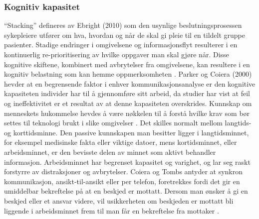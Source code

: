 \subsubsection{Kognitiv kapasitet}
“Stacking” defineres av Ebright (2010) som den usynlige beslutningsprosessen sykepleiere utfører om hva, hvordan og når de skal gi pleie til en tildelt gruppe pasienter. Stadige endringer i omgivelsene og informasjonsflyt resulterer i en kontinuerlig re-prioritisering av hvilke oppgaver man skal gjøre når. Disse kognitive skiftene, kombinert med avbrytelser fra omgivelsene, kan resultere i en kognitiv belastning som kan hemme oppmerksomheten \cite{Ebright10}. Parker og Coiera (2000) hevder at en begrensende faktor i enhver kommunikasjonsanalyse er den kognitive kapasiteten individer har til å gjennomføre sitt arbeid, da studier har vist at feil og ineffektivitet er et resultat av at denne kapasiteten overskrides. Kunnskap om menneskets hukommelse hevdes å være nøkkelen til å forstå hvilke krav som bør settes til teknologi brukt i slike omgivelser \cite{Parker00}. Det skilles normalt mellom langtids- og korttidsminne. Den passive kunnskapen man besitter ligger i langtidsminnet, for eksempel medisinske fakta eller viktige datoer, mens kortidsminnet, eller arbeidsminnet, er den bevisste delen av minnet som aktivt behandler informasjon. Arbeidsminnet har begrenset kapasitet og varighet, og lar seg raskt forstyrre av distraksjoner og avbrytelser. Coiera og Tombs antyder at synkron kommunikasjon, ansikt-til-ansikt eller per telefon, foretrekkes fordi det gir en umiddelbar bekreftelse på at en beskjed er mottatt. Dersom man ønsker å gi en beskjed eller et ansvar videre, vil usikkerheten om beskjeden er mottatt bli liggende i arbeidsminnet frem til man får en bekreftelse fra mottaker \cite{Parker00}. 

